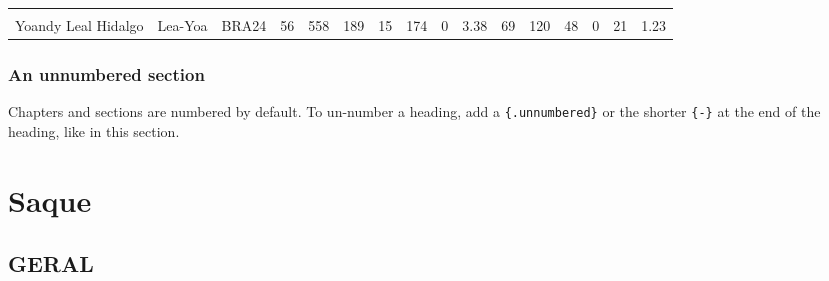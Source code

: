 \documentclass[
]{book}
\begin{document}
\begin{table}[!h]
{\begin{tabular}[t]{lllrrrrrrrrrrrrr}
\cellcolor{gray!10}{Ricardo Lucarelli Souza} & \cellcolor{gray!10}{Sou-Ric} & \cellcolor{gray!10}{BRA24} & \cellcolor{gray!10}{74} & \cellcolor{gray!10}{711} & \cellcolor{gray!10}{225} & \cellcolor{gray!10}{16} & \cellcolor{gray!10}{209} & \cellcolor{gray!10}{0} & \cellcolor{gray!10}{3.04} & \cellcolor{gray!10}{74} & \cellcolor{gray!10}{151} & \cellcolor{gray!10}{50} & \cellcolor{gray!10}{0} & \cellcolor{gray!10}{24} & \cellcolor{gray!10}{1.00}\\
Yoandy Leal Hidalgo & Lea-Yoa & BRA24 & 56 & 558 & 189 & 15 & 174 & 0 & 3.38 & 69 & 120 & 48 & 0 & 21 & 1.23\\
\bottomrule
\end{tabular}}
\end{table}

\subsection*{An unnumbered section}\label{an-unnumbered-section}

Chapters and sections are numbered by default. To un-number a heading, add a \texttt{\{.unnumbered\}} or the shorter \texttt{\{-\}} at the end of the heading, like in this section.

\chapter{Saque}\label{cross}

\section{GERAL}\label{geral}

\begin{table}[!h]
\centering
{}
\end{table}
\end{document}
